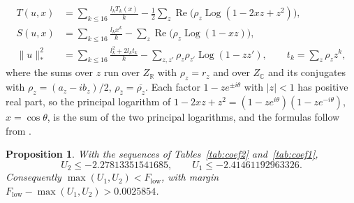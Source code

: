 \documentclass[11pt]{article}
\newtheorem{proposition}[theorem]{Proposition}
\theoremstyle{definition}
\begin{document}
\begin{align*}
T(u,x)&=\sum_{k\le16}\frac{l_kT_k(x)}{k}-\frac12\sum_z\operatorname{Re}\big(\rho_z\operatorname{Log}(1-2xz+z^2)\big),\\
S(u,x)&=\sum_{k\le16}\frac{l_kx^k}{k}-\sum_z\operatorname{Re}\big(\rho_z\operatorname{Log}(1-xz)\big),\\
\|u\|_*^2&=\sum_{k\le16}\frac{l_k^2+2l_kt_k}{k}-\sum_{z,z'}\rho_z\rho_{z'}\operatorname{Log}(1-zz'),\qquad t_k=\sum_z\rho_zz^k,
\end{align*}
where the sums over $z$ run over $Z_{\mathbb R}$ with $\rho_z=r_z$ and over $Z_{\mathbb C}$ and its conjugates with $\rho_z=(a_z-ib_z)/2$, $\rho_{\bar z}=\overline{\rho_z}$. Each factor $1-ze^{\pm i\theta}$ with $|z|<1$ has positive real part, so the principal logarithm of $1-2xz+z^2=(1-ze^{i\theta})(1-ze^{-i\theta})$, $x=\cos\theta$, is the sum of the two principal logarithms, and the formulas follow from \cite[Eq.~(82)]{OAI}.

\begin{proposition}\label{prop:c4}
With the sequences of Tables~\ref{tab:coef2} and~\ref{tab:coef1},
\[
U_2\le-2.27813351541685,\qquad U_1\le-2.41461192963326 .
\]
Consequently $\max(U_1,U_2)<F_{\mathrm{low}}$, with margin $F_{\mathrm{low}}-\max(U_1,U_2)>0.0025854$.
\end{proposition}
\end{document}
